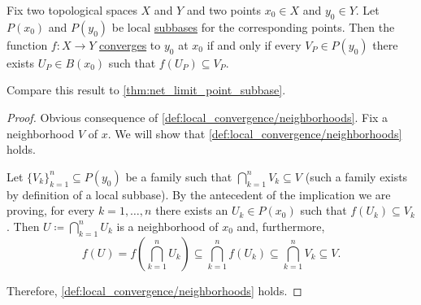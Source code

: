 \begin{proposition}\label{thm:cauchy_function_convergence_via_subbases}
  Fix two topological spaces \( X \) and \( Y \) and two points \( x_0 \in X \) and \( y_0 \in Y \). Let \( P(x_0) \) and \( P(y_0) \) be local \hyperref[def:topological_local_subbase]{subbases} for the corresponding points. Then the function \( f: X \to Y \) \hyperref[def:local_convergence]{converges} to \( y_0 \) at \( x_0 \) if and only if every \( V_P \in P(y_0) \) there exists \( U_P \in B(x_0) \) such that \( f(U_P) \subseteq V_P \).

  Compare this result to \cref{thm:net_limit_point_subbase}.
\end{proposition}
\begin{proof}
  \SufficiencySubProof Obvious consequence of \cref{def:local_convergence/neighborhoods}.
  \NecessitySubProof Fix a neighborhood \( V \) of \( x \). We will show that \cref{def:local_convergence/neighborhoods} holds.

  Let \( \{ V_k \}_{k=1}^n \subseteq P(y_0) \) be a family such that \( \bigcap_{k=1}^n V_k \subseteq V \) (such a family exists by definition of a local subbase). By the antecedent of the implication we are proving, for every \( k = 1, \ldots, n \) there exists an \( U_k \in P(x_0) \) such that \( f(U_k) \subseteq V_k \). Then \( U \coloneqq \bigcap_{k=1}^n U_k \) is a neighborhood of \( x_0 \) and, furthermore,
  \begin{equation*}
    f(U)
    =
    f\left(\bigcap_{k=1}^n U_k \right)
    \subseteq
    \bigcap_{k=1}^n f(U_k)
    \subseteq
    \bigcap_{k=1}^n V_k
    \subseteq
    V.
  \end{equation*}

  Therefore, \cref{def:local_convergence/neighborhoods} holds.
\end{proof}
